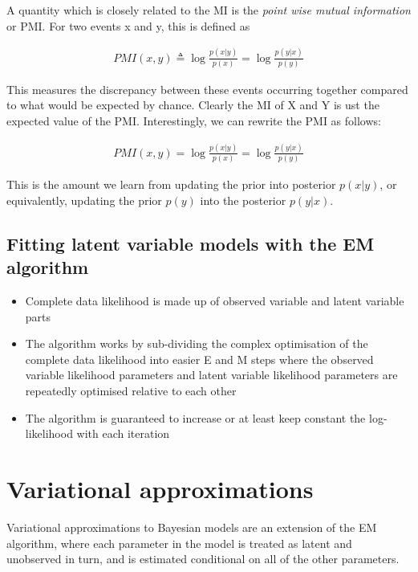 \documentclass{amsart}
\begin{document}
A quantity which is closely related to the MI is the \emph{point wise mutual information}
or PMI. For two events x and y, this is defined as

\begin{align*}
	PMI(x, y) \triangleq \log{\frac{p(x|y)}{p(x)}} = \log{\frac{p(y|x)}{p(y)}}
\end{align*}

This measures the discrepancy between these events occurring together compared to what
would be expected by chance. Clearly the MI of X and Y is ust the expected value
of the PMI. Interestingly, we can rewrite the PMI as follows:

\begin{align*}
	PMI(x, y) = \log{\frac{p(x|y)}{p(x)}} = \log{\frac{p(y|x)}{p(y)}}
\end{align*}

This is the amount we learn from updating the prior into posterior $p(x|y)$, or
equivalently, updating the prior $p(y)$ into the posterior $p(y|x)$.

\subsection{Fitting latent variable models with the EM algorithm}
\begin{itemize}
\item Complete data likelihood is made up of observed variable and latent variable parts
\item The algorithm works by sub-dividing the complex optimisation of the complete data
likelihood into easier E and M steps where the observed variable likelihood parameters 
and latent variable likelihood parameters are repeatedly optimised relative to each 
other
\item The algorithm is guaranteed to increase or at least keep constant the log-
likelihood with each iteration
\end{itemize}

\section{Variational approximations}
Variational approximations to Bayesian models are an extension of the EM algorithm,
where each parameter in the model is treated as latent and unobserved in turn, and is
estimated conditional on all of the other parameters.
\end{document}
